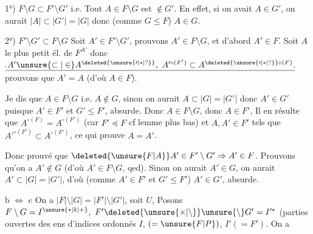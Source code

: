  1°) $F\setminus G\subset F'\setminus G'$ i.e. Tout $A\in F\setminus G$ est $\notin G'$. En effet, si on avait $A\in G'$, on aurait $|A|\subset|G'|=|G|$ donc  (comme $G\leq F$) $A\in G$.


2°) $F'\setminus G'\subset F\setminus G$ Soit $A'\in F'\setminus G'$, prouvons $A'\in F\setminus G$, et d'abord $A'\in F$.  Soit $A$ le plus petit él. de $F^{A'}$ donc $\underline{\rule[-.15ex]{.35pt}{.55ex}\,A'\unsure{\subset|\in} A^{\deleted{\unsure{\prime|\ast|?}}},\ A'^{\circ(F')}\subset A^{\deleted{\unsure{\prime|\ast|?}}\circ(F)}\,\rule[-.15ex]{.35pt}{.55ex}}$ prouvons que $A'=A$ (d'où $A\in F$). 

Je dis que $A\in F\setminus G$ i.e. $A\notin G$, sinon on aurait $A\subset|G|=|G'|$ donc $A'\in G'$ puisque $A'\in F'$ et $G'\leq F'$, absurde.  Donc $A\in F\setminus G$, donc $A\in F'$,  Il en résulte que $A^{\circ(F)}=A^{\circ(F')}$ (car $F'\preceq F$\deleted{)} cf lemme plus bas) et   $A,A'\in F'$ tels que $A'^{\circ(F')}\subset A^{\circ(F')}$, ce qui prouve $A=A'$.

Donc  prouvé que $\deleted{\unsure{F|A}}A'\in F'\setminus G'\Rightarrow A'\in F$. Prouvons qu'on a $A'\notin G$ (d'où $A'\in F\setminus G$\deleted{)}, qed). Sinon on aurait $A'\in G$, on aurait $A'\subset |G|=|G'|$, d'où (comme $A'\in F'$ et $G'\leq F'$) $A'\in G'$, absurde.


b $\Longleftrightarrow$ c  On a $|F|\setminus|G|=|F'|\setminus|G'|$, soit $U$, Posons $F\setminus G=I^{\unsure{\ast|k|+}},\ F'\deleted{\unsure{\times|\setminus}}\unsure{\setminus}G'=I'^{\ast}$ (parties ouvertes des ens d'indices ordonnés $I$,  $(=\unsure{F|P})$, $I'(=F')$. On a

